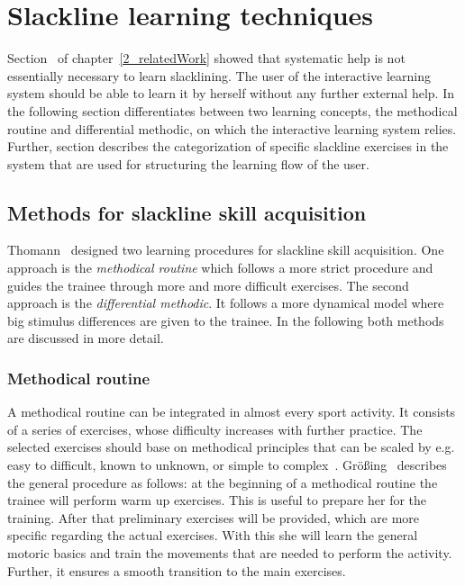 \section{Slackline learning techniques}\label{3_3_learningTechniques}
Section~\textit{} of chapter~\ref{2_relatedWork} showed that systematic help is not essentially necessary to learn slacklining. The user of the interactive learning system should be able to learn it by herself without any further external help. In the following section \textit{} differentiates between two learning concepts, the methodical routine and differential methodic, on which the interactive learning system relies.
Further, section \textit{} describes the categorization of specific slackline exercises in the system that are used for structuring the learning flow of the user.

\subsection{Methods for slackline skill acquisition}\label{3_3_1_learningConcepts}
Thomann~\cite{Thomann2013-aa} designed two learning procedures for slackline skill acquisition. One approach is the \textit{methodical routine} which follows a more strict procedure and guides the trainee through more and more difficult exercises. The second approach is the \textit{differential methodic}. It follows a more dynamical model where big stimulus differences are given to the trainee. In the following both methods are discussed in more detail.

\subsubsection{Methodical routine}
A methodical routine can be integrated in almost every sport activity. It consists of a series of exercises, whose difficulty increases with further practice. The selected exercises should base on methodical principles that can be scaled by e.g. easy to difficult, known to unknown, or simple to complex~\cite{Fetz1996-ml}. Größing~\cite{Groessing1997-sp} describes the general procedure as follows: at the beginning of a methodical routine the trainee will perform warm up exercises. This is useful to prepare her for the training. After that preliminary exercises will be provided, which are more specific regarding the actual exercises. With this she will learn the general motoric basics and train the movements that are needed to perform the activity. Further, it ensures a smooth transition to the main exercises.

